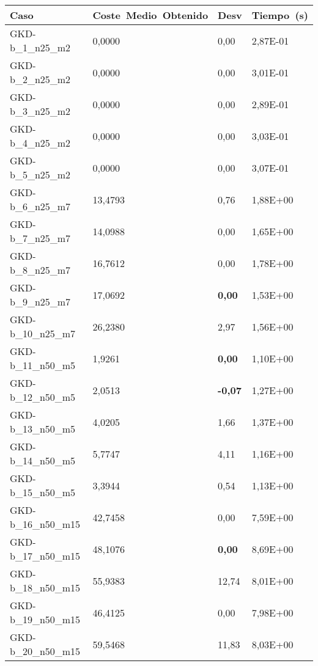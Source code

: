 \pagebreak

\begin{table}[!ht]%
    \centering    
    \begin{adjustbox}{height=12cm}
    \begin{tabular}{|l|l|l|l|}
    \hline
        Caso & Coste~Medio~Obtenido & Desv & Tiempo~(s) \\ \hline
		GKD-b\_1\_n25\_m2    & 0,0000   & 0,00           & 2,87E-01 \\ \hline
		GKD-b\_2\_n25\_m2    & 0,0000   & 0,00           & 3,01E-01 \\ \hline
		GKD-b\_3\_n25\_m2    & 0,0000   & 0,00           & 2,89E-01 \\ \hline
		GKD-b\_4\_n25\_m2    & 0,0000   & 0,00           & 3,03E-01 \\ \hline
		GKD-b\_5\_n25\_m2    & 0,0000   & 0,00           & 3,07E-01 \\ \hline
		GKD-b\_6\_n25\_m7    & 13,4793  & 0,76           & 1,88E+00 \\ \hline
		GKD-b\_7\_n25\_m7    & 14,0988  & 0,00           & 1,65E+00 \\ \hline
		GKD-b\_8\_n25\_m7    & 16,7612  & 0,00           & 1,78E+00 \\ \hline
		GKD-b\_9\_n25\_m7    & 17,0692  & \textbf{0,00}  & 1,53E+00 \\ \hline
		GKD-b\_10\_n25\_m7   & 26,2380  & 2,97			 & 1,56E+00 \\ \hline
		GKD-b\_11\_n50\_m5   & 1,9261   & \textbf{0,00}  & 1,10E+00 \\ \hline
		GKD-b\_12\_n50\_m5   & 2,0513   & \textbf{-0,07} & 1,27E+00 \\ \hline
		GKD-b\_13\_n50\_m5   & 4,0205   & 1,66           & 1,37E+00 \\ \hline
		GKD-b\_14\_n50\_m5   & 5,7747   & 4,11           & 1,16E+00 \\ \hline
		GKD-b\_15\_n50\_m5   & 3,3944   & 0,54           & 1,13E+00 \\ \hline
		GKD-b\_16\_n50\_m15  & 42,7458  & 0,00           & 7,59E+00 \\ \hline
		GKD-b\_17\_n50\_m15  & 48,1076  & \textbf{0,00}  & 8,69E+00 \\ \hline
		GKD-b\_18\_n50\_m15  & 55,9383  & 12,74          & 8,01E+00 \\ \hline
		GKD-b\_19\_n50\_m15  & 46,4125  & 0,00           & 7,98E+00 \\ \hline
		GKD-b\_20\_n50\_m15  & 59,5468  & 11,83			 & 8,03E+00 \\ \hline

\end{tabular}
\end{adjustbox}
\end{table}
